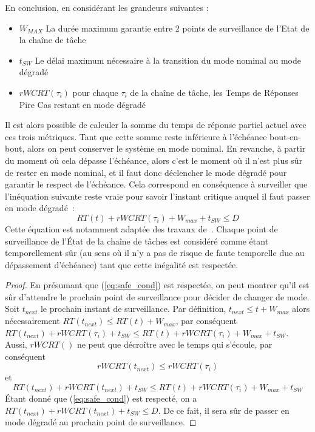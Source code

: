 \documentclass[french, a4paper, 11pt, twoside, pdftex]{StyleThese}
\begin{document}
	En conclusion, en considérant les grandeurs suivantes : 
	\begin{itemize}
		\item 	$ W_{MAX} $ La durée maximum garantie entre 2 points de surveillance de l'Etat de la chaîne de tâche
		\item 	$ t_{SW} $ Le délai maximum nécessaire à la transition du mode nominal au mode dégradé
		\item 	$ rWCRT(\tau_i) $ pour chaque $\tau_i$ de la chaîne de tâche, les Temps de Réponses Pire Cas restant en mode dégradé
	\end{itemize}
	Il est alors possible de calculer la somme du temps de réponse partiel actuel avec ces trois métriques. Tant que cette somme reste inférieure à l'échéance bout-en-bout, alors on peut conserver le système en mode nominal. En revanche, à partir du moment où cela dépasse l'échéance, alors c'est le moment où il n'est plus sûr de rester en mode nominal, et il faut donc déclencher le mode dégradé pour garantir le respect de l'échéance. Cela correspond en conséquence à surveiller que l'inéquation suivante reste vraie pour savoir l'instant critique auquel il faut passer en mode dégradé~:
	\begin{equation} \label{eq:safe_cond}
		RT(t) + rWCRT(\tau_i) + W_{max} + t_{SW} \leq D
	\end{equation} 
	Cette équation est notamment adaptée des travaux de~\cite{kritikakou_run-time_2014}. Chaque point de surveillance de l'État de la chaîne de tâches est considéré comme étant temporellement sûr (au sens où il n'y a pas de risque de faute temporelle due au dépassement d'échéance) tant que cette inégalité est respectée.
    
    \begin{proof}
		En présumant que (\ref{eq:safe_cond}) est respectée, on peut montrer qu'il est sûr d'attendre le prochain point de surveillance pour décider de changer de mode. Soit $t_{next}$ le prochain instant de surveillance.
		Par définition, $t_{next} \leq t + W_{max}$ alors nécessairement $RT(t_{next}) \leq RT(t) + W_{max}$, par conséquent  \\
		$RT(t_{next}) + rWCRT(\tau_i) + t_{SW} \leq RT(t) + rWCRT(\tau_i) + W_{max} + t_{SW}$. \\
		Aussi, $rWCRT()$ ne peut que décroître avec le temps qui s'écoule, par conséquent
		\[ rWCRT(t_{next}) \leq rWCRT(\tau_i)	\]
		et 
\[ RT(t_{next}) + rWCRT(t_{next}) + t_{SW} \leq RT(t) + rWCRT(\tau_i) + W_{max} + t_{SW} \] 
		Étant donné que (\ref{eq:safe_cond}) est respecté, on a $RT(t_{next}) + rWCRT(t_{next}) + t_{SW} \leq D$.
		De ce fait, il sera sûr de passer en mode dégradé au prochain point de surveillance.  
    \end{proof}
    
\end{document}

